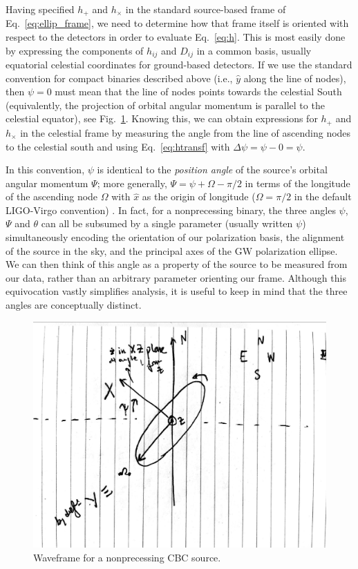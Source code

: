\documentclass[aps,prd,twocolumn,superscriptaddress,preprintnumbers,floatfix,nofootinbib]{revtex4-2}
\newcommand*{\eq}[1]{Eq.~\eqref{eq:#1}}
\newcommand*{\red}[1]{#1}
\newcommand*{\red}[1]{{\color{purple} #1}}
\begin{document}
Having specified $h_+$ and $h_\times$ in the standard source-based frame of Eq.~\eqref{eq:ellip_frame}, we need to determine how that frame itself is oriented with respect to the detectors in order to evaluate \eq{h}.
This is most easily done by expressing the components of $h_{ij}$ and $D_{ij}$ in a common basis, usually equatorial celestial coordinates for ground-based detectors.
If we use the standard convention for compact binaries described above (i.e., $\hat{y}$ along the line of nodes), then $\psi = 0$ must mean that the line of nodes points towards the celestial South \cite{LALSuite:source} (equivalently, the projection of orbital angular momentum is parallel to the celestial equator), see  Fig.~\ref{fig:waveframe}.
Knowing this, we can obtain expressions for $h_+$ and $h_\times$ in the celestial frame by measuring the angle from the line of ascending nodes to the celestial south and using \eq{htransf} with $\Delta\psi = \psi - 0 =\psi$.

In this convention, $\psi$ is identical to the \emph{position angle} of the source's orbital angular momentum $\Psi$; more generally, $\Psi = \psi \red{+} \Omega \red{-} \pi/2$ in terms of the longitude of the ascending node $\Omega$ with $\hat{x}$ as the origin of longitude ($\Omega = \pi/2$ in the default LIGO-Virgo convention) \cite{LALSuite:source}.
In fact, for a nonprecessing binary, the three angles $\psi$, $\Psi$ and $\theta$ can all be subsumed by a single parameter (usually written $\psi$) simultaneously encoding the orientation of our polarization basis, the alignment of the source in the sky, and the principal axes of the GW polarization ellipse.
We can then think of this angle as a property of the source to be measured from our data, rather than an arbitrary parameter orienting our frame.
Although this equivocation vastly simplifies analysis, it is useful to keep in mind that the three angles are conceptually distinct.

\begin{figure}
\includegraphics[width=\columnwidth]{waveframe}
\caption{Waveframe for a nonprecessing CBC source.}
\label{fig:waveframe}
\end{figure}
\end{document}
